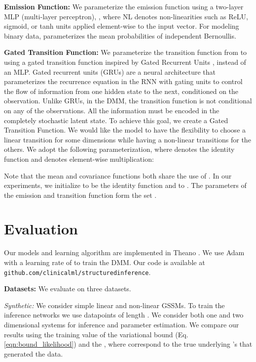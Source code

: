 \documentclass[letterpaper]{article}
\theoremstyle{plain}
\newcommand{\citep}{\cite}
\newcommand{\DKF}{DMM\xspace}
\begin{document}
{\bf Emission Function:} 
We parameterize the emission function  using a two-layer MLP (multi-layer perceptron),
,
where NL denotes non-linearities such as ReLU, sigmoid, or
tanh units applied element-wise to the input vector. 
For modeling binary data, 
parameterizes the mean probabilities of independent Bernoullis. 

{\bf Gated Transition Function:} 
We parameterize the transition function from  to  using
a gated transition function inspired by Gated
Recurrent Units \citep{chung2014empirical}, instead of an MLP.
Gated recurrent units (GRUs) are a neural architecture that parameterizes the recurrence equation in the 
RNN with gating units to control the flow of information from one hidden state to the next, conditioned on the observation. 
Unlike GRUs, in the \DKF, the transition function is not conditional on any of the observations. All the information
must be encoded in the completely stochastic latent state. To achieve this goal, we create 
a Gated Transition Function. 
We would like the model to have the flexibility to choose
a linear transition for some dimensions while having
a non-linear transitions for the others. We 
adopt the following parameterization, where  denotes 
the identity function and  denotes element-wise multiplication:


Note that the mean and covariance functions both share the use of .
In our experiments, we initialize  to be the identity function and  to .
The parameters of the emission and transition function 
form the set . 
 \section{Evaluation}
Our models and learning algorithm are implemented in Theano \cite{theano}. 
We use Adam \cite{kingma2014adam} with a learning rate of  to train the \DKF. 
Our code is available at \texttt{\small github.com/clinicalml/structuredinference}.

\textbf{Datasets: } We evaluate on three datasets. 

\textit{Synthetic: } We consider simple linear and non-linear GSSMs. To train
the inference networks we use  datapoints of length . We consider
both one and two dimensional systems for inference and parameter estimation. 
We compare our results using the training value of the variational bound  (Eq. \ref{eqn:bound_likelihood}) and the
,
where  correspond to the true underlying 's that generated the data. 
\end{document}
